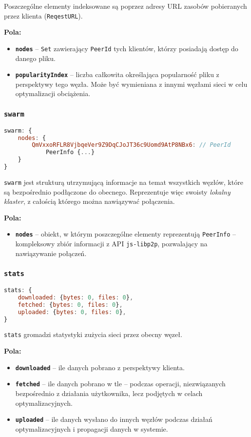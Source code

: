 Poszczególne elementy indeksowane są poprzez adresy URL zasobów pobieranych przez klienta (\texttt{ReqestURL}).

\textbf{Pola:}
\begin{itemize}
    \item \textbf{\texttt{nodes}} -- \texttt{Set} zawierający \texttt{PeerId} tych klientów, którzy posiadają dostęp do danego pliku.
    \item \textbf{\texttt{popularityIndex}} -- liczba całkowita określająca popularność pliku z perspektywy tego węzła. Może być wymieniana z innymi węzłami sieci w celu optymalizacji obciążenia.
\end{itemize}

% 

\subsubsection{\texttt{swarm}}
\begin{lstlisting}[language=javascript]
swarm: { 
    nodes: { 
        QmVxxoRFLR8VjbqeVer9Z9DqCJoJT36c9Uomd9AtP8NBx6: // PeerId
            PeerInfo {...}
    } 
}
\end{lstlisting}
\texttt{swarm} jest strukturą utrzymującą informacje na temat wszystkich węzłów, które są bezpośrednio podłączone do obecnego. Reprezentuje więc swoisty {\em lokalny klaster}, z całością którego można nawiązywać połączenia.

\textbf{Pola:}
\begin{itemize}
    \item \textbf{\texttt{nodes}} -- obiekt, w którym poszczególne elementy reprezentują \texttt{PeerInfo} -- kompleksowy zbiór informacji z API \texttt{js-libp2p}, pozwalający na nawiązywanie połączeń.
\end{itemize}

% 

\subsubsection{\texttt{stats}}
\begin{lstlisting}[language=javascript]
stats: {
    downloaded: {bytes: 0, files: 0},
    fetched: {bytes: 0, files: 0},
    uploaded: {bytes: 0, files: 0},
}
\end{lstlisting}
\texttt{stats} gromadzi statystyki zużycia sieci przez obecny węzeł.

\textbf{Pola:}
\begin{itemize}
    \item \textbf{\texttt{downloaded}} -- ile danych pobrano z perspektywy klienta.
    \item \textbf{\texttt{fetched}} -- ile danych pobrano w tle -- podczas operacji, niezwiązanych bezpośrednio z działania użytkownika, lecz podjętych w celach optymalizacyjnych.
    \item \textbf{\texttt{uploaded}} -- ile danych wysłano do innych węzłów podczas działań optymalizacyjnych i propagacji danych w systemie.
\end{itemize}

